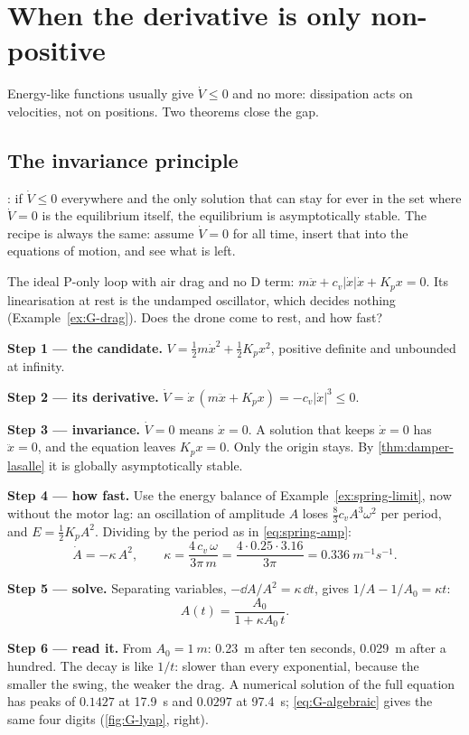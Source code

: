 \section{When the derivative is only non-positive}

Energy-like functions usually give $\dot V \le 0$ and no more: dissipation acts on velocities, not on positions. Two theorems close the gap.

\subsection{The invariance principle}
: if $\dot V \le 0$ everywhere and the only solution that can stay for ever in the set where $\dot V = 0$ is the equilibrium itself, the equilibrium is asymptotically stable. The recipe is always the same: assume $\dot V = 0$ for all time, insert that into the equations of motion, and see what is left.

\begin{example}
\label{ex:G-algebraic}
The ideal P-only loop with air drag and no D term: $m\ddot x + c_v|\dot x|\dot x + K_px = 0$. Its linearisation at rest is the undamped oscillator, which decides nothing (Example~\ref{ex:G-drag}). Does the drone come to rest, and how fast?

\textbf{Step 1 — the candidate.} $V = \tfrac12m\dot x^2 + \tfrac12K_px^2$, positive definite and unbounded at infinity.

\textbf{Step 2 — its derivative.} $\dot V = \dot x\,(m\ddot x + K_px) = -c_v|\dot x|^3 \le 0$.

\textbf{Step 3 — invariance.} $\dot V = 0$ means $\dot x = 0$. A solution that keeps $\dot x = 0$ has $\ddot x = 0$, and the equation leaves $K_px = 0$. Only the origin stays. By \cref{thm:damper-lasalle} it is globally asymptotically stable.

\textbf{Step 4 — how fast.} Use the energy balance of Example~\ref{ex:spring-limit}, now without the motor lag: an oscillation of amplitude $A$ loses $\tfrac83c_vA^3\omega^2$ per period, and $E = \tfrac12K_pA^2$. Dividing by the period as in \cref{eq:spring-amp}:
\begin{equation*}
  \dot A = -\kappa\,A^2, \qquad \kappa = \frac{4\,c_v\,\omega}{3\pi\,m} = \frac{4 \cdot 0.25 \cdot 3.16}{3\pi} = \SI{0.336}{m^{-1}s^{-1}} .
\end{equation*}

\textbf{Step 5 — solve.} Separating variables, $-\dd A/A^2 = \kappa\,\dd t$, gives $1/A - 1/A_0 = \kappa t$:
\begin{equation}\label{eq:G-algebraic}
  A(t) = \frac{A_0}{1 + \kappa A_0\,t} .
\end{equation}

\textbf{Step 6 — read it.} From $A_0 = \SI{1}{m}$: \SI{0.23}{m} after ten seconds, \SI{0.029}{m} after a hundred. The decay is like $1/t$: slower than every exponential, because the smaller the swing, the weaker the drag. A numerical solution of the full equation has peaks of $0.1427$ at \SI{17.9}{s} and $0.0297$ at \SI{97.4}{s}; \cref{eq:G-algebraic} gives the same four digits (\cref{fig:G-lyap}, right).
\end{example}

